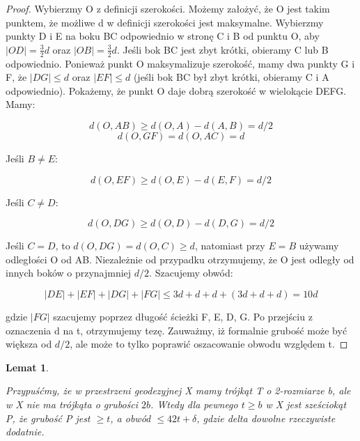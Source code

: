 \documentclass[licencjacka]{pracamgr}
\newtheorem{lemma}{Lemat}[section]
\begin{document}
\begin{proof}



Wybierzmy O z definicji szerokości. Możemy założyć, że O jest takim punktem, że możliwe d w definicji szerokości jest maksymalne. Wybierzmy punkty D i E na boku BC odpowiednio w stronę C i B od punktu O, aby $|OD| = \frac{3}{2} d$ oraz $|OB| = \frac{3}{2} d$. Jeśli bok BC jest zbyt krótki, obieramy C lub B odpowiednio. Ponieważ punkt O maksymalizuje szerokość, mamy dwa punkty G i F, że $|DG| \leq d$ oraz $|EF| \leq d$ (jeśli bok BC był zbyt krótki, obieramy C i A odpowiednio). Pokażemy, że punkt O daje dobrą szerokość w wielokącie DEFG. Mamy:

\[ d(O, AB) \geq d(O, A) - d(A, B) = d / 2 \]
\[ d(O, GF) = d(O, AC) = d \]

\noindent
Jeśli $B \neq E$:

\[ d(O, EF) \geq d(O, E) - d(E, F) = d/2 \]

\noindent
Jeśli $C \neq D$:

\[ d(O, DG) \geq d(O, D) - d(D, G) = d/2 \]

Jeśli $C = D$, to $d(O, DG) = d(O, C) \geq d$, natomiast przy $E =B$ używamy odległości O od AB. Niezależnie od przypadku otrzymujemy, że O jest odległy od innych boków o przynajmniej $d/2$. Szacujemy obwód:

\[ |DE| + |EF| + |DG| + |FG| \leq 3d + d + d + (3d + d +d) = 10d \]

\noindent
gdzie $|FG|$ szacujemy poprzez długość ścieżki F, E, D, G. Po przejściu z oznaczenia d na t, otrzymujemy tezę. Zauważmy, iż formalnie grubość może być większa od $d/2$, ale może to tylko poprawić oszacowanie obwodu względem t.

\end{proof}

\begin{lemma}\label{lemma:olshanskii_2}

Przypuśćmy, że w przestrzeni geodezyjnej X mamy trójkąt T o 2-rozmiarze b, ale w X nie ma trójkąta o grubości $2b$. Wtedy dla pewnego $t \geq b$ w X jest sześciokąt P, że grubość P jest $\geq t$, a obwód $\leq 42t + \delta$, gdzie delta dowolne rzeczywiste dodatnie.

\end{lemma}
\end{document}
